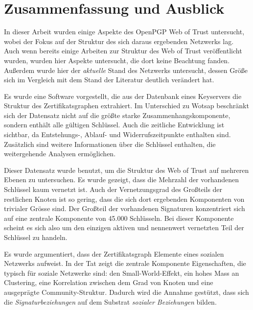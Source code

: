 
\chapter{Zusammenfassung und Ausblick}
\label{ch:Zusammenfassung}

In dieser Arbeit wurden einige Aspekte des OpenPGP Web of Trust
untersucht, wobei der Fokus auf der Struktur des sich daraus
ergebenden Netzwerks lag.
Auch wenn bereits einige Arbeiten zur Struktur des Web of Trust
veröffentlicht wurden, wurden hier Aspekte untersucht, die dort
keine Beachtung fanden. Außerdem wurde hier der \emph{aktuelle} Stand
des Netzwerks untersucht, dessen Größe sich im Vergleich mit dem Stand
der Literatur deutlich verändert hat.

Es wurde eine Software vorgestellt, die aus der Datenbank eines
Keyservers die Struktur des Zertifikatsgraphen extrahiert. Im
Unterschied zu Wotsap beschränkt sich der Datensatz nicht auf die
größte starke Zusammenhangskomponente, sondern enthält alle
g\"ultigen Schlüssel. Auch die zeitliche Entwicklung ist sichtbar, da
Entstehungs-, Ablauf- und Widerrufszeitpunkte enthalten
sind. Zus\"atzlich sind weitere Informationen \"uber die Schl\"ussel
enthalten, die weitergehende Analysen erm\"oglichen.

Dieser Datensatz wurde benutzt, um die Struktur des Web of Trust auf
mehreren Ebenen zu untersuchen. Es wurde gezeigt, dass die Mehrzahl
der vorhandenen Schlüssel kaum vernetzt ist. Auch der Vernetzungsgrad
des Gro{\ss}teils der restlichen Knoten ist so gering, dass die sich
dort ergebenden Komponenten von trivialer Gr\"osse sind. Der
Gro{\ss}teil der vorhandenen Signaturen konzentriert sich auf 
eine zentrale Komponente von 45.000 Schlüsseln. Bei dieser Komponente
scheint es sich also um den einzigen aktiven und nennenwert vernetzten
Teil der Schl\"ussel zu handeln.

Es wurde argumentiert, dass der Zertifikatsgraph Elemente eines
sozialen Netzwerks aufweist. In der Tat zeigt die zentrale
Komponente Eigenschaften, die typisch für soziale Netzwerke sind:
den Small-World-Effekt, ein hohes Mass an Clustering, eine Korrelation
zwischen dem Grad von Knoten und eine ausgeprägte
Community-Struktur. Dadurch wird die Annahme gest\"utzt, dass sich die
\emph{Signaturbeziehungen} auf dem Substrat \emph{sozialer
  Beziehungen} bilden.

